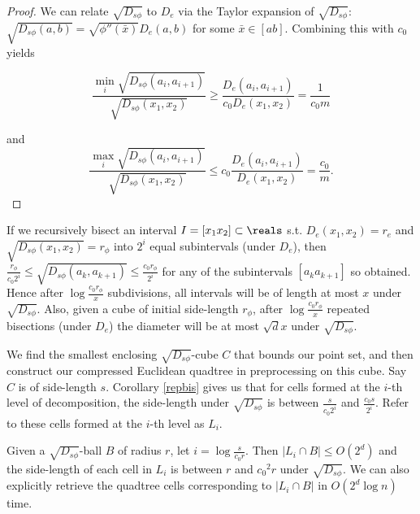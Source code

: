 \documentclass[11pt]{myclass}
\newcommand{\sbreg}{\ensuremath{D_{s\phi}}}
\begin{document}
\begin{proof}
We can relate $\sqrt{\sbreg}$ to $D_e$ via the Taylor expansion of $\sqrt{\sbreg}$:
 $\sqrt{\sbreg(a,b)} = \sqrt{ \phi''(\bar{x}) } D_e(a,b)$ for some $\bar{x} \in [a b]$. Combining this with $c_0$ yields 

\begin{equation}
\frac{ \min_{i} \sqrt{\sbreg(a_i , a_{i+1})}}{\sqrt{\sbreg(x_1,x_2) } } 
\geq \frac{D_e(a_i, a_{i+1})}{c_0 D_e(x_1, x_2)} = \frac{1}{c_0 m}
\end{equation}

and  
\begin{equation}
\frac{ \max_{i} \sqrt{\sbreg(a_i , a_{i+1})}}{\sqrt{\sbreg(x_1,x_2) } } 
\leq c_0 \frac{D_e(a_i, a_{i+1})}{D_e(x_1, x_2)} = \frac{c_0}{m}.
\end{equation}

\end{proof}

\begin{corollary}\label{repbis}
If we recursively bisect an interval $I = [x_1 x_2] \subset \reals$ s.t. $D_e(x_1, x_2) = r_e$ and $\sqrt{\sbreg(x_1,x_2)} = r_{\phi}$ 
into $2^i$ equal subintervals (under $D_e$), then 
$\frac{r_{\phi} }{c_0 2^i } \leq \sqrt{\sbreg (a_k, a_{k+1}) }\leq  \frac{c_0 r_{\phi}}{2^i}$ for any of the
subintervals $[a_k a_{k+1}]$ so obtained. Hence after $\log \frac{c_0 r_{\phi}}{ x}$ subdivisions, all intervals will be of length 
at most $x$ under $\sqrt{\sbreg}$.
Also, given a cube of initial side-length $r_{\phi}$, after $\log \frac{c_0 r_{\phi} }{ x}$ repeated bisections (under $D_e$) 
the diameter will be at most  $\sqrt{d} x$ under $\sqrt{\sbreg}$.
\end{corollary}

We find the smallest enclosing $\sqrt{\sbreg}$-cube $C$ that bounds our point set, 
and then construct our compressed Euclidean quadtree in preprocessing on this cube.  Say $C$
is of side-length $s$.
Corollary \ref{repbis} gives us that for cells formed at the $i$-th level of decomposition, 
the side-length under $\sqrt{\sbreg}$ is between $\frac{s}{c_0 2^i}$ and $\frac{c_0 s}{ 2^i}$. Refer to these cells formed at the $i$-th level as $L_i$.

\begin{lemma}\label{packingTheTree}
Given a $\sqrt{\sbreg}$-ball $B$ of radius $r$, let $i = \log \frac{ s}{c_0 r}$. 
Then $|L_i \cap B| \leq O(2^d)$ and the side-length of each cell in $L_i$ is between $r$ and ${c_0}^2 r$ under $\sqrt{\sbreg}$. 
We can also explicitly retrieve the quadtree cells corresponding to $|L_i \cap B|$ in $O(2^d \log n)$ time.
\end{lemma}
\end{document}

